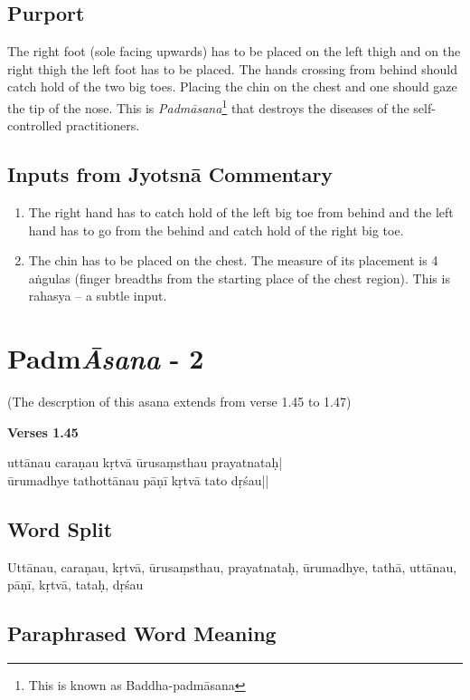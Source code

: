 \subsection*{Purport}


The right foot (sole facing upwards) has to be placed on the left thigh and on the right thigh the left foot has to be placed. The hands crossing from behind should catch hold of the two big toes. Placing the chin on the chest and one should gaze the tip of the nose. This is \textit{Padmāsana}\footnote{This is known as Baddha-padmāsana} that destroys the diseases of the self-controlled practitioners.

\subsection*{Inputs from Jyotsnā Commentary}


\begin{enumerate}
\item The right hand has to catch hold of the left big toe from behind and the left hand has to go from the behind and catch hold of the right big toe. 
\item The chin has to be placed on the chest. The measure of its placement is 4 aṅgulas (finger breadths from the starting place of the chest region). This is rahasya – a subtle input.  
\end{enumerate}

\section*{Padm\textit{Āsana} - 2}

\centerline{(The descrption of this asana extends from verse 1.45 to 1.47)}

\noindent \textbf{Verses 1.45}

\begin{shloka}
uttānau caraṇau kṛtvā ūrusaṃsthau prayatnataḥ|\\
ūrumadhye tathottānau pāṇī kṛtvā tato dṛśau||
\end{shloka}

\subsection*{Word Split}


Uttānau, caraṇau, kṛtvā, ūrusaṃsthau, prayatnataḥ, ūrumadhye, tathā, uttānau, pāṇī, kṛtvā, tataḥ, dṛśau

\subsection*{Paraphrased Word Meaning}


